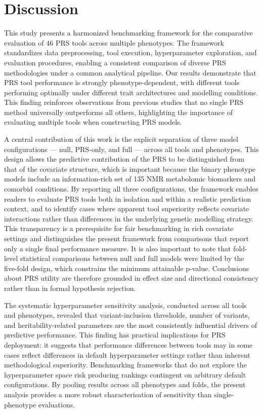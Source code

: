 \documentclass[pdflatex,sn-basic]{sn-jnl}
\begin{document}
\section*{Discussion}

This study presents a harmonized benchmarking framework for the comparative evaluation of 46 PRS tools across multiple phenotypes. The framework standardizes data preprocessing, tool execution, hyperparameter exploration, and evaluation procedures, enabling a consistent comparison of diverse PRS methodologies under a common analytical pipeline. Our results demonstrate that PRS tool performance is strongly phenotype-dependent, with different tools performing optimally under different trait architectures and modelling conditions. This finding reinforces observations from previous studies that no single PRS method universally outperforms all others, highlighting the importance of evaluating multiple tools when constructing PRS models.

A central contribution of this work is the explicit separation of three model configurations --- null, PRS-only, and full --- across all tools and phenotypes. This design allows the predictive contribution of the PRS to be distinguished from that of the covariate structure, which is important because the binary phenotype models include an information-rich set of 135 NMR metabolomic biomarkers and comorbid conditions. By reporting all three configurations, the framework enables readers to evaluate PRS tools both in isolation and within a realistic prediction context, and to identify cases where apparent tool superiority reflects covariate interactions rather than differences in the underlying genetic modelling strategy. This transparency is a prerequisite for fair benchmarking in rich covariate settings and distinguishes the present framework from comparisons that report only a single final performance measure. It is also important to note that fold-level statistical comparisons between null and full models were limited by the five-fold design, which constrains the minimum attainable p-value. Conclusions about PRS utility are therefore grounded in effect size and directional consistency rather than in formal hypothesis rejection.

The systematic hyperparameter sensitivity analysis, conducted across all tools and phenotypes, revealed that variant-inclusion thresholds, number of variants, and heritability-related parameters are the most consistently influential drivers of predictive performance. This finding has practical implications for PRS deployment: it suggests that performance differences between tools may in some cases reflect differences in default hyperparameter settings rather than inherent methodological superiority. Benchmarking frameworks that do not explore the hyperparameter space risk producing rankings contingent on arbitrary default configurations. By pooling results across all phenotypes and folds, the present analysis provides a more robust characterisation of sensitivity than single-phenotype evaluations.
\end{document}
